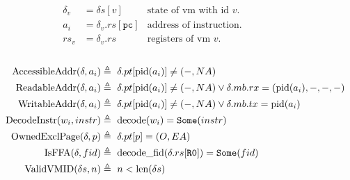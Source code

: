 \documentclass[a4paper]{article}
\newcommand*{\defined}{\triangleq\ }
\newcommand*{\DN}[1]{\mathtt{Done} \; {#1}}
\newcommand*{\NXT}[1]{\mathtt{Next} \; {#1}}
\newcommand*{\decode}{\text{decode}}
\newcommand*{\pid}{\text{pid}}
\newcommand{\SOME}{\mathtt{Some}}
\begin{document}
\newcommand{\ta}[1]{\text{to\_addr}({#1})}
\newcommand{\tw}[1]{\text{to\_word}({#1})}
\newcommand{\tv}[1]{\text{to\_vmid}({#1})}
\newcommand{\DNNXT}[1]{\DN{\NXT{ {#1} }}}
\newcommand{\DNXT}[2]{(\DN{\NXT{ {#1} }}, {#2})}
\begin{figure}[h!]
    \begin{align*}
      \delta_v&=\delta s[v] & \text{state of vm with id }v.\\
      a_i&=\delta_v.rs[\mathtt{pc}] & \text{address of instruction}. \\
      rs_v&=\delta_v.rs & \text{registers of vm }v.
    \end{align*}
    \\
    \begin{align*}
      \text{AccessibleAddr}(\delta,a_i) &\defined \delta.pt[\pid(a_i)]\ne(-,NA) \\
      \text{ReadableAddr}(\delta,a_i) &\defined \delta.pt[\pid(a_i)]\ne(-,NA) \lor \delta.mb.rx=(\pid(a_i),-,-,-) \\
      \text{WritableAddr}(\delta,a_i) &\defined \delta.pt[\pid(a_i)]\ne(-,NA) \lor \delta.mb.tx=\pid(a_i) \\
      \text{DecodeInstr}(w_i,instr) &\defined \decode(w_i)=\SOME(instr)\\
      \text{OwnedExclPage}(\delta,p) & \defined \delta.pt[p]=(O,EA)\\
      \text{IsFFA}(\delta, fid) & \defined \text{decode\_fid}(\delta.rs[\reg{R0}])=\SOME(fid)\\
      \text{ValidVMID}(\delta s,n) &\defined n<\text{len}(\delta s)
      \end{align*}
  \end{figure}
\end{document}
